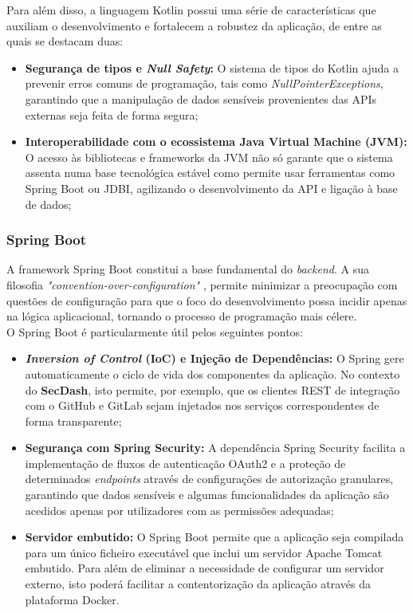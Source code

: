 Para além disso, a linguagem Kotlin possui uma série de características que auxiliam o desenvolvimento e fortalecem a robustez da aplicação, de entre as quais se destacam duas:

\begin{itemize}
	\item \textbf{Segurança de tipos e \textit{Null Safety}:} O sistema de tipos do Kotlin ajuda a prevenir erros comuns de programação, tais como \textit{NullPointerExceptions}, garantindo que a manipulação de dados sensíveis provenientes das APIs externas seja feita de forma segura;
	
	\item \textbf{Interoperabilidade com o ecossistema Java Virtual Machine (JVM):} O acesso às bibliotecas e frameworks da JVM não só garante que o sistema assenta numa base tecnológica estável como permite usar ferramentas como Spring Boot ou JDBI, agilizando o desenvolvimento da API e ligação à base de dados;
\end{itemize}

\subsubsection{Spring Boot}

A framework Spring Boot constitui a base fundamental do \textit{backend}. A sua filosofia \textit{"convention-over-configuration"} \cite{coc}, permite minimizar a preocupação com questões de configuração para que o foco do desenvolvimento possa incidir apenas na lógica aplicacional, tornando o processo de programação mais célere. \\

O Spring Boot é particularmente útil pelos seguintes pontos:

\begin{itemize}
	\item \textbf{\textit{Inversion of Control} (IoC) e Injeção de Dependências:} O Spring gere automaticamente o ciclo de vida dos componentes da aplicação. No contexto do \textbf{SecDash}, isto permite, por exemplo, que os clientes REST de integração com o GitHub e GitLab sejam injetados nos serviços correspondentes de forma transparente;
	
	\item \textbf{Segurança com Spring Security:} A dependência Spring Security facilita a implementação de fluxos de autenticação OAuth2 e a proteção de determinados \textit{endpoints} através de configurações de autorização granulares, garantindo que dados sensíveis e algumas funcionalidades da aplicação são acedidos apenas por utilizadores com as permissões adequadas;
	
	\item \textbf{Servidor embutido:} O Spring Boot permite que a aplicação seja compilada para um único ficheiro executável que inclui um servidor Apache Tomcat embutido. Para além de eliminar a necessidade de configurar um servidor externo, isto poderá facilitar a contentorização da aplicação através da plataforma Docker.

\end{itemize}
